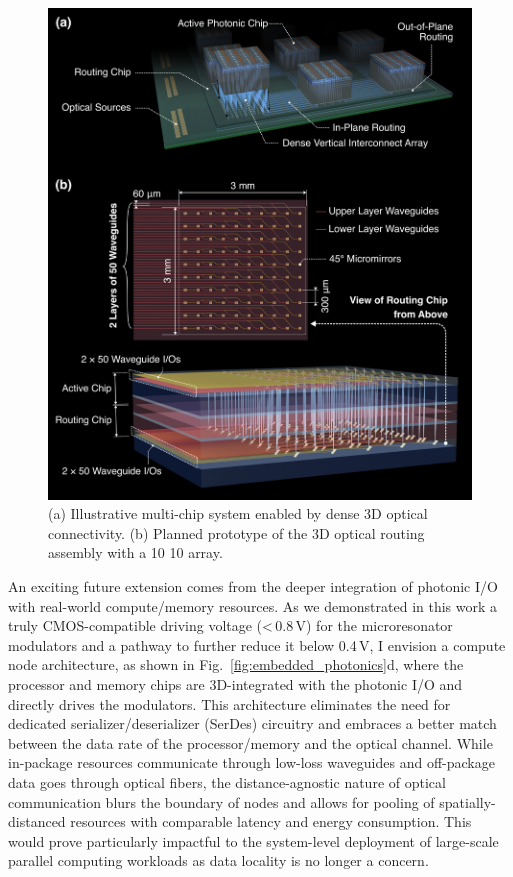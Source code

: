 \begin{figure}
    \vspace{-1em}
    \begin{center}
        \includegraphics[width=\linewidth]{../../6_figures/rs_fig_2_3dpho.png}
    \end{center}
    \caption{(a) Illustrative multi-chip system enabled by dense 3D optical connectivity. (b) Planned prototype of the 3D optical routing assembly with a 10 \texttimes{} 10 array.}
    \label{fig:3d_photonics}
    \vspace{-0.5em}
\end{figure}

An exciting future extension comes from the deeper integration of photonic I/O with real-world compute/memory resources. As we demonstrated in this work a truly CMOS-compatible driving voltage (<\,0.8\,V) for the microresonator modulators and a pathway to further reduce it below 0.4\,V, I envision a compute node architecture, as shown in Fig.~\ref{fig:embedded_photonics}d, where the processor and memory chips are 3D-integrated with the photonic I/O and directly drives the modulators. This architecture eliminates the need for dedicated serializer/deserializer (SerDes) circuitry and embraces a better match between the data rate of the processor/memory and the optical channel. While in-package resources communicate through low-loss waveguides and off-package data goes through optical fibers, the distance-agnostic nature of optical communication blurs the boundary of nodes and allows for pooling of spatially-distanced resources with comparable latency and energy consumption. This would prove particularly impactful to the system-level deployment of large-scale parallel computing workloads as data locality is no longer a concern.

